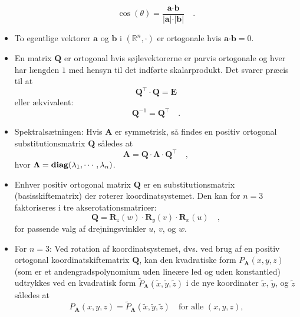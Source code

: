 \begin{summary}
\begin{itemize}
\begin{equation}
\cos(\theta) = \frac{\mathbf{a} \bm{\cdot} \mathbf{b}}{\vert \mathbf{a} \vert \cdot \vert \mathbf{b} \vert} \quad.
\end{equation}
\item To egentlige vektorer $\mathbf{a}$ og $\mathbf{b}$ i $(\mathbb{R}^{n}, \bm{\cdot})$ er ortogonale hvis $\mathbf{a}\bm{\cdot}\mathbf{b} =  0$.
\item En matrix $\mathbf{Q}$ er ortogonal hvis søjlevektorerne er parvis ortogonale og hver har længden $1$ med hensyn til det indførte skalarprodukt. Det svarer præcis til at
    \begin{equation} \mathbf{Q}^{\top}\cdot \mathbf{Q} = \mathbf{E}
    \end{equation}
     eller ækvivalent:
     \begin{equation}
     \mathbf{Q}^{-1} = \mathbf{Q}^{\top} \quad.
     \end{equation}
\item Spektralsætningen: Hvis $\mathbf{A}$ er symmetrisk, så findes en positiv ortogonal substitutionsmatrix $\mathbf{Q}$ således at
\begin{equation}
\mathbf{A} = \mathbf{Q} \cdot \bm{\Lambda} \cdot \mathbf{Q}^{\top} \quad ,
\end{equation}
hvor  $\bm{\Lambda} = \operatorname{\bf{diag}}(\lambda_{1}, \cdots , \lambda_{n})$.
\item Enhver positiv ortogonal matrix $\mathbf{Q}$ er en substitutionsmatrix (basisskiftematrix) der roterer koordinatsystemet. Den kan for $n=3$ faktoriseres i tre akserotationsmatricer:
\begin{equation}
\mathbf{Q} = \mathbf{R}_{z}(w) \cdot \mathbf{R}_{y}(v) \cdot \mathbf{R}_{x}(u) \quad ,
\end{equation}
for passende valg af drejningsvinkler $u$, $v$, og $w$.
\item For $n=3$: Ved rotation af koordinatsystemet, dvs. ved brug af en positiv ortogonal koordinat\-skifte\-ma\-trix $\mathbf{Q}$, kan den kvadratiske form $P_{\mathbf{A}}(x,y,z)$ (som er et andengradspolynomium uden lineære led og uden konstantled) udtrykkes ved en kvadratisk form $\widetilde{P}_{\bm{\Lambda}}(\widetilde{x}, \widetilde{y}, \widetilde{z})$ i de nye koordinater $\widetilde{x}$, $\widetilde{y}$, og $\widetilde{z}$ således at
    \begin{equation}
    P_{\mathbf{A}}(x,y,z) = \widetilde{P}_{\bm{\Lambda}}(\widetilde{x}, \widetilde{y}, \widetilde{z}) \quad \textrm{for alle $(x,y,z)$,}
    \end{equation}

\end{itemize}
\end{summary}
